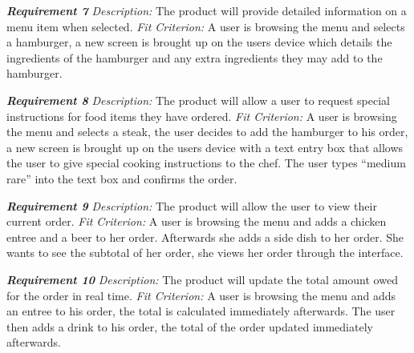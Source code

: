 \documentclass[12pt, titlepage]{article}
\begin{document}
\noindent\textbf{\textit{Requirement 7}}\newline
\textit{Description:}\newline
The product will provide detailed information on a menu item when selected. \newline\newline
\textit{Fit Criterion:}\newline 
A user is browsing the menu and selects a hamburger, a new screen is brought up on the users device which details the ingredients of the hamburger and any extra ingredients they may add to the hamburger.
\newline

\noindent\textbf{\textit{Requirement 8}}\newline
\textit{Description:}\newline
The product will allow a user to request special instructions for food items they have ordered. \newline\newline
\textit{Fit Criterion:}\newline 
A user is browsing the menu and selects a steak, the user decides to add the hamburger to his order, a new screen is brought up on the users device with a text entry box that allows the user to give special cooking instructions to the chef. The user types “medium rare” into the text box and confirms the order.
\newline

\noindent\textbf{\textit{Requirement 9}}\newline
\textit{Description:}\newline
The product will allow the user to view their current order. \newline\newline
\textit{Fit Criterion:}\newline 
A user is browsing the menu and adds a chicken entree and a beer to her order. Afterwards she adds a side dish to her order. She wants to see the subtotal of her order, she views her order through the interface.
\newline

\noindent\textbf{\textit{Requirement 10}}\newline
\textit{Description:}\newline
The product will update the total amount owed for the order in real time. \newline\newline
\textit{Fit Criterion:}\newline 
A user is browsing the menu and adds an entree to his order, the total is calculated immediately afterwards. The user then adds a drink to his order, the total of the order updated immediately afterwards.
\newline
\end{document}

